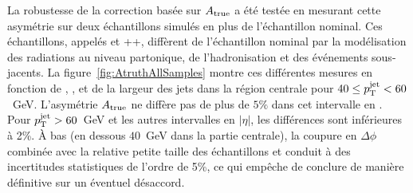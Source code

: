 La robustesse de la correction bas\'ee sur $A_{\rm true}$ a \'et\'e test\'ee en mesurant cette asym\'etrie sur deux \'echantillons simul\'es en plus de l'\'echantillon nominal. Ces \'echantillons, appel\'es  et \herwig++, diff\`erent de l'\'echantillon nominal par la mod\'elisation des radiations au niveau partonique, de l'hadronisation et des \'ev\'enements sous-jacents. La figure~\ref{fig:AtruthAllSamples} montre ces diff\'erentes mesures en fonction de \fpres{}, \fem{}, \ftile{} et de la largeur des jets dans la r\'egion centrale pour $40 \le p_{\mathrm{T}}^\mathrm{jet} < 60$~GeV. L'asym\'etrie $A_{\rm true}$ ne diff\`ere pas de plus de $5 \%$ dans cet intervalle en \pt. Pour $p_{\mathrm{T}}^\mathrm{jet} > 60$~GeV et les autres intervalles en $|\eta|$, les diff\'erences sont inf\'erieures \`a 2\%. \`A bas \ptjet{} (en dessous $40$~GeV dans la partie centrale), la coupure en $\Delta \phi$ combin\'ee avec la relative petite taille des \'echantillons  et \herwigpp{} conduit \`a des incertitudes statistiques de l'ordre de 5\%, ce qui emp\^eche de conclure de mani\`ere d\'efinitive sur un \'eventuel d\'esaccord.

